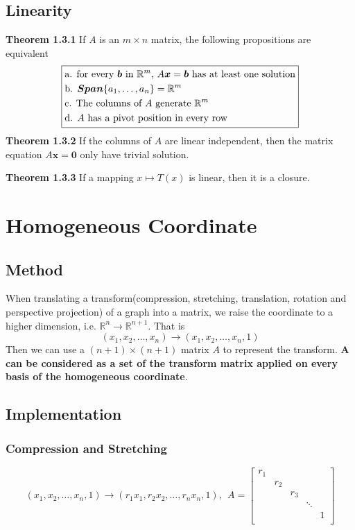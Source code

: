 \documentclass[11pt]{article}
\begin{document}
\subsection{Linearity}
\noindent \textbf{Theorem 1.3.1} If $A$ is an $m \times n $ matrix, the following propositions are equivalent
\begin{equation}
\boxed{\begin{aligned}
    &\text{a. for every $\bm{b}$ in $\mathbb{R}^m$, $A\bm{x} = \bm{b}$ has at least one solution}\\
    &\text{b. $\bm{Span}\{a_1, \dots, a_n\} = \mathbb{R}^m$}\\
    &\text{c. The columns of $A$ generate $\mathbb{R}^m$}\\
    &\text{d. $A$ has a pivot position in every row} \notag
\end{aligned}}
\end{equation}
\textbf{Theorem 1.3.2} If the columns of $A$ are linear independent, then the matrix equation $A\bm{x} = \bm{0}$ only have trivial solution. \par
\noindent \textbf{Theorem 1.3.3} If a mapping $x \mapsto T(x)$ is linear, then it is a closure.
\section{Homogeneous Coordinate}
\subsection{Method}
When translating a transform(compression, stretching, translation, rotation and perspective projection) of a graph into a matrix, we raise the coordinate to a higher dimension, i.e. $\mathbb{R}^{n} \rightarrow \mathbb{R}^{n+1}$. That is
\begin{equation}
    (x_1,x_2,\dots,x_n) \rightarrow (x_1,x_2,\dots,x_n,1)
\end{equation}
Then we can use a $(n+1)\times(n+1)$ matrix $A$ to represent the transform. \textbf{$\bm{A}$ can be considered as a set of the transform matrix applied on every basis of the homogeneous coordinate}.
\subsection{Implementation}
\subsubsection{Compression and Stretching}
\begin{equation}
    (x_1,x_2,\dots,x_n,1) \rightarrow (r_1x_1,r_2x_2,\dots,r_nx_n,1),~~
A=
\begin{bmatrix}
    r_1 &  &  & &\\
     & r_2 &  & &\\
     &  & r_3 &  &\\
     &  &  & \ddots & \\
     &  &  &  & 1\\
\end{bmatrix}
\end{equation}
\end{document}
